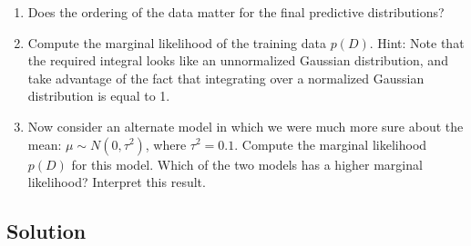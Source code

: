 \documentclass[submit]{harvardml}
\begin{document}
\begin{problem}
\begin{enumerate}
  \item Does the ordering of the data matter for the final predictive
  distributions?  

  \item Compute the marginal likelihood of the training data $p(D)$.
  Hint: Note that the required integral looks like an unnormalized
  Gaussian distribution, and take advantage of the fact that
  integrating over a normalized Gaussian distribution is equal to 1.

  \item Now consider an alternate model in which we were much more sure
  about the mean: $\mu \sim N(0,\tau^2)$, where $\tau^2 = 0.1$.
  Compute the marginal likelihood $p(D)$ for this model.  Which of the
  two models has a higher marginal likelihood? Interpret this result.
\end{enumerate}

\end{problem}

\subsection*{Solution}
\end{document}
